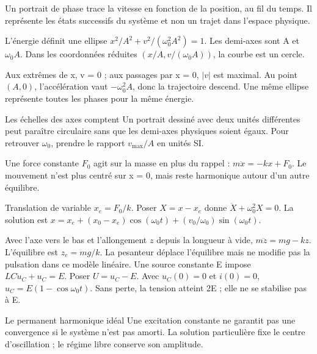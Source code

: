 Un portrait de phase trace la vitesse en fonction de la position, au fil du temps. Il représente les états successifs du système et non un trajet dans l’espace physique.
\begin{loi}{L’énergie définit une ellipse}
$x^2/A^2+v^2/(\omega_0^2A^2)=1$. Les demi-axes sont A et $\omega_0A$. Dans les coordonnées réduites $(x/A,v/(\omega_0A))$, la courbe est un cercle.
\end{loi}
Aux extrêmes de x, v = 0 ; aux passages par x = 0, $|v|$ est maximal. Au point $(A,0)$, l’accélération vaut $-\omega_0^2A$, donc la trajectoire descend. Une même ellipse représente toutes les phases pour la même énergie.
\begin{piege}{Les échelles des axes comptent}
Un portrait dessiné avec deux unités différentes peut paraître circulaire sans que les demi-axes physiques soient égaux. Pour retrouver $\omega_0$, prendre le rapport $v_{\max}/A$ en unités SI.
\end{piege}


Une force constante $F_0$ agit sur la masse en plus du rappel : $m\ddot x=-kx+F_0$. Le mouvement n’est plus centré sur x = 0, mais reste harmonique autour d’un autre équilibre.
\begin{loi}{Translation de variable}
$x_e=F_0/k$. Poser $X=x-x_e$ donne $\ddot X+\omega_0^2X=0$. La solution est $x=x_e+(x_0-x_e)\cos(\omega_0t)+(v_0/\omega_0)\sin(\omega_0t)$.
\end{loi}
Avec l’axe vers le bas et l’allongement $z$ depuis la longueur à vide, $m\ddot z=mg-kz$. L’équilibre est $z_e=mg/k$. La pesanteur déplace l’équilibre mais ne modifie pas la pulsation dans ce modèle linéaire.
Une source constante E impose $LC\ddot u_C+u_C=E$. Poser $U=u_C-E$. Avec $u_C(0)=0$ et $i(0)=0$, $u_C=E(1-\cos\omega_0t)$. Sans perte, la tension atteint 2E ; elle ne se stabilise pas à E.
\begin{piege}{Le permanent harmonique idéal}
Une excitation constante ne garantit pas une convergence si le système n’est pas amorti. La solution particulière fixe le centre d’oscillation ; le régime libre conserve son amplitude.
\end{piege}



